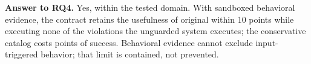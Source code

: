 \textbf{Answer to RQ4.} Yes, within the tested domain. With sandboxed behavioral evidence, the contract retains the usefulness of original \harness{} within 10 points while executing none of the violations the unguarded system executes; the conservative catalog costs  points of success. Behavioral evidence cannot exclude input-triggered behavior; that limit is contained, not prevented.


